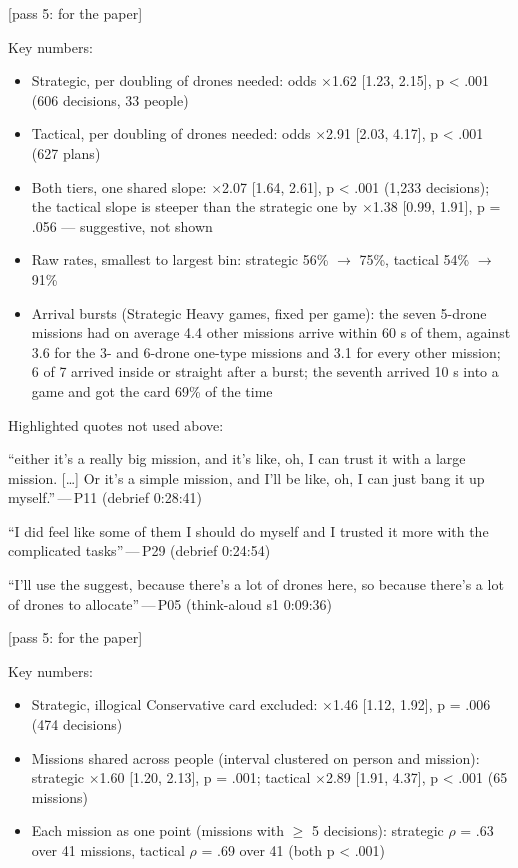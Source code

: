 \begin{options}

 {\footnotesize [pass 5: for the paper]}

\noindent Key numbers:\begin{itemize}[leftmargin=1.2em,itemsep=0pt]\footnotesize
\item Strategic, per doubling of drones needed: odds $\times$1.62 [1.23, 2.15], p < .001 (606 decisions, 33 people)
\item Tactical, per doubling of drones needed: odds $\times$2.91 [2.03, 4.17], p < .001 (627 plans)
\item Both tiers, one shared slope: $\times$2.07 [1.64, 2.61], p < .001 (1,233 decisions); the tactical slope is steeper than the strategic one by $\times$1.38 [0.99, 1.91], p = .056 --- suggestive, not shown
\item Raw rates, smallest to largest bin: strategic 56\% $\rightarrow$ 75\%, tactical 54\% $\rightarrow$ 91\%
\item Arrival bursts (Strategic Heavy games, fixed per game): the seven 5-drone missions had on average 4.4 other missions arrive within 60 s of them, against 3.6 for the 3- and 6-drone one-type missions and 3.1 for every other mission; 6 of 7 arrived inside or straight after a burst; the seventh arrived 10 s into a game and got the card 69\% of the time
\end{itemize}

\noindent Highlighted quotes not used above:\begin{quotelist}
\item ``either it's a really big mission, and it's like, oh, I can trust it with a large mission. [\ldots{}] Or it's a simple mission, and I'll be like, oh, I can just bang it up myself.''\,---\,P11 (debrief 0:28:41)
\item ``I did feel like some of them I should do myself and I trusted it more with the complicated tasks''\,---\,P29 (debrief 0:24:54)
\item ``I'll use the suggest, because there's a lot of drones here, so because there's a lot of drones to allocate''\,---\,P05 (think-aloud s1 0:09:36)
\end{quotelist}

 {\footnotesize [pass 5: for the paper]}

\noindent Key numbers:\begin{itemize}[leftmargin=1.2em,itemsep=0pt]\footnotesize
\item Strategic, illogical Conservative card excluded: $\times$1.46 [1.12, 1.92], p = .006 (474 decisions)
\item Missions shared across people (interval clustered on person and mission): strategic $\times$1.60 [1.20, 2.13], p = .001; tactical $\times$2.89 [1.91, 4.37], p < .001 (65 missions)
\item Each mission as one point (missions with $\geq$ 5 decisions): strategic $\rho$ = .63 over 41 missions, tactical $\rho$ = .69 over 41 (both p < .001)
\end{itemize}


\end{options}
